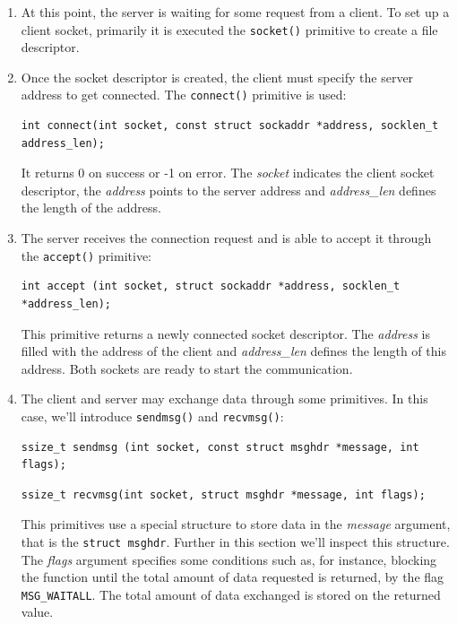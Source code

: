 \begin{enumerate}
\item At this point, the server is waiting for some request from a client. To set up a client socket, primarily it is executed the \texttt{socket()} primitive to create a file descriptor.

\item Once the socket descriptor is created, the client must specify the server address to get connected. The \texttt{connect()} primitive is used:

\begin{lstlisting}[style=CInputStyle]
int connect(int socket, const struct sockaddr *address, socklen_t address_len);
\end{lstlisting}

It returns 0 on success or -1 on error. The \textit{socket} indicates the client socket descriptor, the \textit{address} points to the server address and \textit{address\_len} defines the length of the address.

\item The server receives the connection request and is able to accept it through the \texttt{accept()} primitive:

\begin{lstlisting}[style=CInputStyle]
int accept (int socket, struct sockaddr *address, socklen_t *address_len);
\end{lstlisting}

This primitive returns a newly connected socket descriptor. The \textit{address} is filled with the address of the client and \textit{address\_len} defines the length of this address. Both sockets are ready to start the communication.

\item The client and server may exchange data through some primitives. In this case, we'll introduce \texttt{sendmsg()} and \texttt{recvmsg()}:

\begin{lstlisting}[style=CInputStyle]
ssize_t sendmsg (int socket, const struct msghdr *message, int flags);
\end{lstlisting}

\begin{lstlisting}[style=CInputStyle]
ssize_t recvmsg(int socket, struct msghdr *message, int flags);
\end{lstlisting}

This primitives use a special structure to store data in the \textit{message} argument, that is the \texttt{struct msghdr}. Further in this section we'll inspect this structure. The \textit{flags} argument specifies some conditions such as, for instance, blocking the function until the total amount of data requested is returned, by the flag \texttt{MSG\_WAITALL}. The total amount of data exchanged is stored on the returned value.


\end{enumerate}
